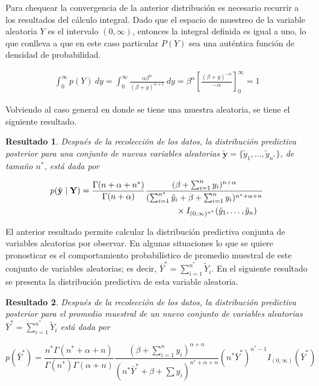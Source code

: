 \documentclass[
  10pt,
  spanish,
]{book}
\newtheorem{proposition}{Resultado}[chapter]
\theoremstyle{definition}
\theoremstyle{definition}
\theoremstyle{definition}
\theoremstyle{definition}
\theoremstyle{remark}
\begin{document}
Para chequear la convergencia de la anterior distribución es necesario recurrir a los resultados del cálculo integral. Dado que el espacio de muestreo de la variable aleatoria \(Y\) es el intervalo \((0,\infty)\), entonces la integral definida es igual a uno, lo que conlleva a que en este caso particular \(P(Y)\) sea una auténtica función de densidad de probabilidad.

\begin{align*}
\int_0^{\infty}p(Y)\ dy=\int_0^{\infty}\frac{\alpha \beta^\alpha}{(\beta+y)^{\alpha+1}} \ dy
=  \beta^\alpha \left[\frac{(\beta+y)^{-\alpha}}{-\alpha} \right]_0^{\infty}
=1
\end{align*}

Volviendo al caso general en donde se tiene una muestra aleatoria, se tiene el siguiente resultado.

\begin{proposition}
\protect\hypertarget{prp:unnamed-chunk-57}{}{\label{prp:unnamed-chunk-57} }Después de la recolección de los datos, la distribución predictiva posterior para una conjunto de nuevas variables aleatorias \(\tilde{\mathbf{y}}=\{\tilde{y}_1,\ldots,\tilde{y}_{n^*}\}\), de tamaño \(n^*\), está dada por

\begin{align}
p(\tilde{\mathbf{y}} \mid \mathbf{Y})&=
\frac{\Gamma(n+\alpha+n^{*})}{\Gamma(n+\alpha)}
\frac{(\beta+\sum_{i=1}^ny_i)^{n+\alpha}}{(\sum_{i=1}^{n^*}\tilde{y}_i+\beta+\sum_{i=1}^ny_i)^{n^*+\alpha+n}}\notag\\
&\hspace{4cm}\times
I_{(0,\infty)^{n^*}}(\tilde{y}_1,\ldots,\tilde{y}_n)
\end{align}
\end{proposition}

El anterior resultado permite calcular la distribución predictiva conjunta de variables aleatorias por observar. En algunas situaciones lo que se quiere pronosticar es el comportamiento probabilístico de promedio muestral de este conjunto de variables aleatorias; es decir, \(\bar{Y}^*=\sum_{i=1}^{n^*}\tilde{Y}_i\). En el siguiente resultado se presenta la distribución predictiva de esta variable aleatoria.

\begin{proposition}
\protect\hypertarget{prp:unnamed-chunk-58}{}{\label{prp:unnamed-chunk-58} }Después de la recolección de los datos, la distribución predictiva posterior para el promedio muestral de un nuevo conjunto de variables aleatorias \(\bar{Y}^*=\sum_{i=1}^{n^*}\tilde{Y}_i\) está dada por

\begin{equation*}
p(\bar{Y}^*)=\frac{n^*\Gamma(n^*+\alpha+n)}{\Gamma(n^*)\Gamma(\alpha+n)}\frac{(\beta+\sum_{i=1}^ny_i)^{\alpha+n}}{(n^*\bar{Y}^*+\beta+\sum y_i)^{n^*+\alpha+n}}(n^*\bar{Y}^*)^{n^*-1}I_{(0,\infty)}(\bar{Y}^*)
\end{equation*}
\end{proposition}
\end{document}
